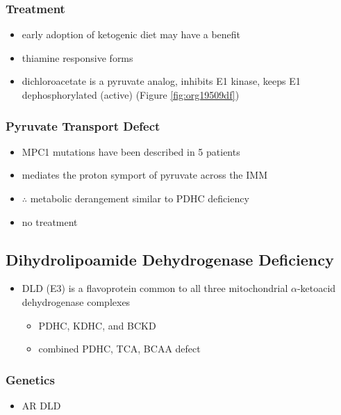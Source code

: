 \documentclass[12pt]{scrartcl}
\begin{document}
\subsubsection{Treatment}
\label{sec:org7d2139c}
\begin{itemize}
\item early adoption of ketogenic diet may have a benefit
\item thiamine responsive forms
\item dichloroacetate is a pyruvate analog, inhibits E1 kinase, keeps E1
dephosphorylated (active) (Figure \ref{fig:org19509df})
\end{itemize}

\subsubsection{Pyruvate Transport Defect}
\label{sec:org1869862}
\begin{itemize}
\item MPC1 mutations have been described in 5 patients
\item mediates the proton symport of pyruvate across the IMM
\item \(\therefore\) metabolic derangement similar to PDHC deficiency
\item no treatment
\end{itemize}

\subsection{Dihydrolipoamide Dehydrogenase Deficiency}
\label{sec:org442cefc}
\begin{itemize}
\item DLD (E3) is a flavoprotein common to all three mitochondrial
\(\alpha\)-ketoacid dehydrogenase complexes
\begin{itemize}
\item PDHC, KDHC, and BCKD
\item combined PDHC, TCA, BCAA defect
\end{itemize}
\end{itemize}
\subsubsection{Genetics}
\label{sec:org3109bcd}
\begin{itemize}
\item AR DLD
\end{itemize}
\end{document}
